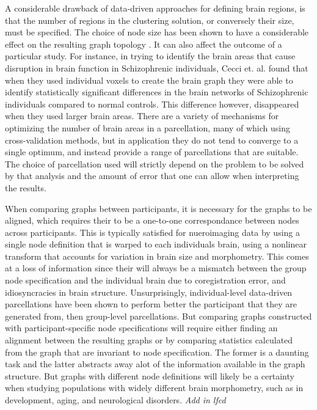 A considerable drawback of data-driven approaches for defining brain regions, is that the number of regions in the clustering solution, or conversely their size, must be specified. The choice of node size has been shown to have a considerable effect on the resulting graph topology \cite{Zalesky}. It can also affect the outcome of a particular study. For instance, in trying to identify the brain areas that cause disruption in brain function in Schizophrenic individuals, Cecci et. al. \cite{Cecci_2009} found that when they used individual voxels to create the brain graph they were able to identify statistically significant differences in the brain networks of Schizophrenic individuals compared to normal controls. This difference however, disappeared when they used larger brain areas. There are a variety of mechanisms for optimizing the number of brain areas in a parcellation, many of which using cross-validation methods, but in application they do not tend to converge to a single optimum, and instead provide a range of parcellations that are suitable. The choice of parcellation used will strictly depend on the problem to be solved by that analysis and the amount of error that one can allow when interpreting the results. 

When comparing graphs between participants, it is necessary for the graphs to be aligned, which requires their to be a one-to-one correspondance between nodes across participants. This is typically satisfied for nueroimaging data by using a single node definition that is warped to each individuals brain, using a nonlinear transform that accounts for variation in brain size and morphometry. This comes at a loss of information since their will always be a mismatch between the group node specification and the individual brain due to coregistration error, and idiosyncracies in brain structure. Unsurprisingly, individual-level data-driven parcellations have been shown to perform better the participant that they are generated from, then group-level parcellations. But  comparing graphs constructed with participant-specific node specifications will require either finding an alignment between the resulting graphs or by comparing statistics calculated from the graph that are invariant to node specification. The former is a daunting task and the latter abstracts away alot of the information available in the graph structure. But graphs with different node definitions will likely be a certainty when studying populations with widely different brain morphometry, such as in development, aging, and neurological disorders. \textit{Add in lfcd}

